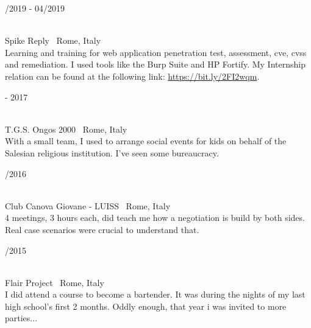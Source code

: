 \begin{minipage}{.3\textwidth}
	/2019 - 04/2019 \faCalendar
\end{minipage}
\hfill
\begin{minipage}{.65\textwidth}
	\vfill
	 \\
	\color{Maroon} Spike Reply \color{Sepia} \hfill \faMapMarker \ Rome, Italy
	\smallskip
	\\
	\color{gray} Learning and training for web application penetration test, assessment, cve, cvss and remediation. I used tools like the Burp Suite and HP Fortify. My Internship relation can be found at the following link: \url{https://bit.ly/2FI2wqm}.
	\vfill
\end{minipage}

\bigskip

\begin{minipage}{.3\textwidth}
	 - 2017 \faCalendar
\end{minipage}
\hfill
\begin{minipage}{.65\textwidth}
	\vfill
	 \\
	\color{Maroon} T.G.S. Ongos 2000 \color{Sepia} \hfill \faMapMarker \ Rome, Italy
	\smallskip
	\\
	\color{gray} With a small team, I used to arrange social events for kids on behalf of the Salesian religious institution. I've seen some bureaucracy. 
	\vfill
\end{minipage}

\bigskip

\begin{minipage}{.3\textwidth}
	/2016 \faCalendar
\end{minipage}
\hfill
\begin{minipage}{.65\textwidth}
	\vfill
	 \\
	\color{Maroon} Club Canova Giovane - LUISS \color{Sepia} \hfill \faMapMarker \ Rome, Italy
	\smallskip
	\\
	\color{gray} 4 meetings, 3 hours each, did teach me how a negotiation is build by both sides. Real case scenarios were crucial to understand that. 
	\vfill
\end{minipage}

\bigskip

\begin{minipage}{.3\textwidth}
	/2015 \faCalendar
\end{minipage}
\hfill
\begin{minipage}{.65\textwidth}
	\vfill
	 \\
	\color{Maroon} Flair Project \color{Sepia} \hfill \faMapMarker \ Rome, Italy
	\smallskip
	\\
	\color{gray} I did attend a course to become a bartender. It was during the nights of my last high school's first 2 months. Oddly enough, that year i was invited to more parties...
	\vfill
\end{minipage}

